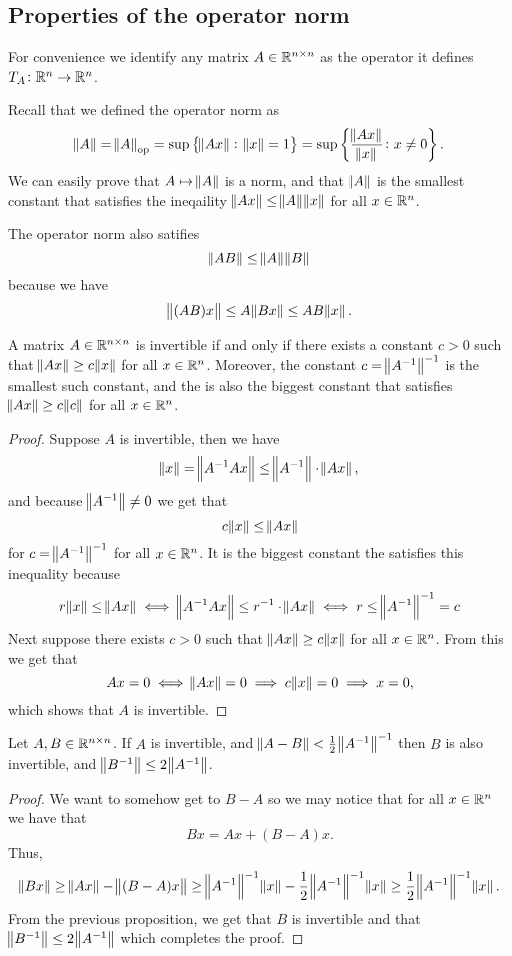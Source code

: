 \documentclass[11pt,a4paper]{article}
\begin{document}
\subsection{Properties of the operator norm}
For convenience we identify any matrix $A \in \mathbb{R}^{n \times n}$ as the operator
it defines $T_A \colon \mathbb{R}^n \to \mathbb{R}^n$.

Recall that we defined the operator norm as
\[
  \norm A = \norm{A}_{\operatorname{op}} = \sup\set{\norm{Ax} \colon \norm{x} = 1} =
  \sup\set{\frac{\norm{Ax}}{\norm x} \colon x \neq 0}.
\]
We can easily prove that $A \mapsto \norm A$ is a norm, and that $\norm A$
is the smallest constant that satisfies the ineqaility 
$\norm{Ax} \le \norm A \norm x$ for all $x \in \mathbb{R}^n$.

The operator norm also satifies
\[
  \norm{AB} \le \norm A \norm B
\]
because we have
\[
  \norm{(AB)x} \le A \norm{Bx} \le AB \norm x.
\]

\begin{proposition}
  A matrix $A \in \mathbb{R}^{n \times n}$ is invertible if and only if there exists
  a constant $c > 0$ such that $\norm{Ax} \geq c \norm x$ for all $x \in \mathbb{R}^n$.
  Moreover, the constant $c = \norm{A^{-1}}^{-1}$ is the smallest such constant,
  and the is also the biggest constant that satisfies $\norm{Ax} \geq c \norm c$
  for all $x \in \mathbb{R}^n$.
\end{proposition}
\begin{proof}
  Suppose $A$ is invertible, then we have
  \[
    \norm x = \norm{A^{-1} A x} \le \norm{A^{-1}} \cdot \norm{Ax},
  \]
  and because $\norm{A^{-1}} \neq 0$ we get that
  \[
    c \norm{x} \le \norm{Ax}
  \]
  for $c = \norm{A^{-1}}^{-1}$ for all $x \in \mathbb{R}^n$.
  It is the biggest constant the satisfies this inequality because
  \[
    r \norm{x} \le \norm{Ax} \iff
    \norm{A^{-1} A x} \le r^{-1} \cdot \norm{Ax} \iff
    r \le \norm{A^{-1}}^{-1} = c
  \]
  Next suppose there exists $c > 0$ such that $\norm{Ax} \geq c \norm x$ for all
  $x \in \mathbb{R}^n$.
  From this we get that
  \[
    Ax = 0 \iff \norm{Ax} = 0 \implies c \norm x = 0 \implies x = 0,
  \]
  which shows that $A$ is invertible.
\end{proof}

\begin{proposition}
  \label{prop:invertible-balls}
  Let $A,B \in \mathbb{R}^{n \times n}$.
  If $A$ is invertible, and $\norm{A - B} < \frac{1}{2} \norm{A^{-1}}^{-1}$ then
  $B$ is also invertible, and $\norm{B^{-1}} \le 2 \norm{A^{-1}}$.
\end{proposition}
\begin{proof}
  We want to somehow get to $B - A$ so we may notice that
  for all $x \in \mathbb{R}^n$ we have that
  \[
    Bx = Ax + (B - A)x.
  \]
  Thus,
  \[
    \norm{Bx} \geq \norm{Ax} - \norm{(B - A)x} \geq
    \norm{A^{-1}}^{-1} \norm x - \frac{1}{2} \norm{A^{-1}}^{-1} \norm x \geq
    \frac{1}{2} \norm{A^{-1}}^{-1} \norm x.
  \]
  From the previous proposition, we get that $B$ is invertible and that
  $\norm{B^{-1}} \le 2 \norm{A^{-1}}$ which completes the proof.
\end{proof}
\end{document}
